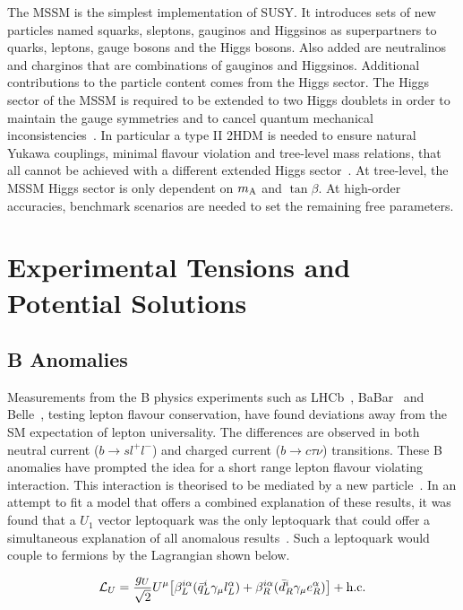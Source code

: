 The \ac{MSSM} is the simplest implementation of \ac{SUSY}.
It introduces sets of new particles named squarks, sleptons, gauginos and Higgsinos as superpartners to quarks, leptons, gauge bosons and the Higgs bosons.
Also added are neutralinos and charginos that are combinations of gauginos and Higgsinos.
Additional contributions to the particle content comes from the Higgs sector.
The Higgs sector of the \ac{MSSM} is required to be extended to two Higgs doublets in order to maintain the gauge symmetries and to cancel quantum mechanical inconsistencies~\cite{SUSY_Primer}.
In particular a type II \ac{2HDM} is needed to ensure natural Yukawa couplings, minimal flavour violation and tree-level mass relations, that all cannot be achieved with a different extended Higgs sector~\cite{SUSY_Primer}.
At tree-level, the \ac{MSSM} Higgs sector is only dependent on $m_{{\text{A}}}$ and $\tan\beta$.
At high-order accuracies, benchmark scenarios are needed to set the remaining free parameters.

\section{Experimental Tensions and Potential Solutions}

\subsection{B Anomalies}
\label{sec:b_anomalies}

Measurements from the B physics experiments such as LHCb~\cite{LHCb:2021trn,LHCb:2015gmp,LHCb:2017rln,LHCb:2017smo}, BaBar~\cite{Kowalewski:2013mna,BaBar:2013mob} and Belle~\cite{Belle:2015qfa,Belle:2016dyj}, testing lepton flavour conservation, have found deviations away from the \ac{SM} expectation of lepton universality.
The differences are observed in both neutral current ($b\rightarrow sl^{+}l^{-}$) and charged current ($b\rightarrow c\tau\nu$) transitions.
These B anomalies have prompted the idea for a short range lepton flavour violating interaction.
This interaction is theorised to be mediated by a new  particle~\cite{Diaz:2017lit,Schmaltz:2018nls}.
In an attempt to fit a model that offers a combined explanation of these results, it was found that a $U_{1}$ vector leptoquark was the only leptoquark that could offer a simultaneous explanation of all anomalous results~\cite{Cornella:2021sby}. 
Such a leptoquark would couple to fermions by the Lagrangian shown below.

\begin{equation}
\mathcal{L}_{U} = \frac{g_{U}}{\sqrt{2}} U^{\mu} \big[ \beta_{L}^{i\alpha}( \bar{q}_{L}^{i} \gamma_{\mu} l_{L}^{\alpha}) + \beta_{R}^{i\alpha}( \bar{d}_{R}^{i} \gamma_{\mu} e_{R}^{\alpha}) \big] + \text{h.c.}
\end{equation}

